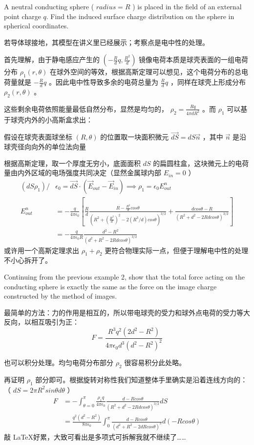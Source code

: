 \begin{solution}
    A neutral conducting sphere ( \(radius = R\) ) is placed in the field of an external point charge \(q\). Find the induced surface charge distribution on the sphere in spherical coordinates.
\tcbrule

    若导体球接地，其模型在讲义里已经展示；考察点是电中性的处理。
    
    首先理解，由于静电感应产生的 \((-\frac{R}{d} q,\frac{R^2}{d})\) 镜像电荷本质是球壳表面的一组电荷分布 \(\rho_1 (r,\theta)\) 在球外空间的等效，根据高斯定理可以想见，这个电荷分布的总电荷量就是 \(-\frac{R}{d} q\) 。因此电中性导致多余的电荷总量为 \(\frac{R}{d} q\) ，同样在球壳上形成分布 \(\rho_2 (r,\theta)\) 。

    这些剩余电荷依照能量最低自然分布，显然是均匀的， \(\rho_2 = \frac{Rq}{4\pi d R^2}\) 。而 \(\rho_1\) 可以基于球壳内外的小高斯盒求出：

    假设在球壳表面球坐标 \((R,\theta)\) 的位置取一块面积微元 \(\vec{dS}=dS \vec{n}\) ，其中 \(\vec{n}\) 是沿球壳径向向外的单位法向量
    
    根据高斯定理，取一个厚度无穷小，底面面积 \(dS\) 的扁圆柱盒，这块微元上的电荷量由内外区域的电场强度共同决定（显然金属球内部 \(E_{in}=0\) ）
    \begin{align}
        (dS \rho_1)/&\epsilon_0 = \vec{dS}\cdot (\vec{E}_{out}-\vec{E}_{in}) \implies \rho_1 = \epsilon_0 E_{out}^n \\
        E_{out}^n&=-\frac{q}{4\pi \epsilon_0}[\frac{R}{d}\frac{R-\frac{R^2}{d} cos\theta}{(R^2+(\frac{R^2}{d})^2-2(R^3/d) cos\theta)^{3/2}}+\frac{d cos\theta - R}{(R^2+d^2-2Rd cos\theta)^{3/2}}]\\
        &=-\frac{q}{4\pi \epsilon_0 R}\frac{d^2-R^2}{(d^2+R^2-2Rdcos\theta)^{3/2}}
    \end{align}
    或许用一个高斯定理求出 \(\rho_1 + \rho_2\) 更符合物理实际一点，但便于理解电中性的处理不小心拆开了。
\end{solution}

\begin{solution}
    Continuing from the previous example 2, show that the total force acting on the conducting sphere is exactly the same as the force on the image charge constructed by the method of images.
\tcbrule

    最简单的方法：力的作用是相互的，所以带电球壳的受力和球外点电荷的受力等大反向，以相互吸引为正：
    \[
        F=\frac{R^3 q^2 (2d^2-R^2)}{4\pi\epsilon_0 d^3 (d^2-R^2)^2}
    \]

    也可以积分处理。均匀电荷分布部分 \(\rho_2\) 很容易积分此处略。
    
    再证明 \(\rho_1\) 部分即可。根据旋转对称性我们知道整体手里确实是沿着连线方向的：（ \(dS=2\pi R^2 sin \theta d\theta\) ）
    \begin{align}
    F&=-\int_{\theta=0}^\pi \frac{\rho_1 q}{4\pi \epsilon_0}\frac{d-R cos \theta}{(R^2+d^2-2Rd cos\theta)^{3/2}}dS\\
    &=\frac{q^2 (d^2-R^2)}{8\pi \epsilon_0}\int_0^\pi \frac{d-Rcos\theta}{(d^2+R^2-2dRcos\theta)^3} d (-Rcos\theta)
    \end{align}
    敲 \LaTeX 好累，大致可看出是多项式可拆解我就不继续了……
\end{solution}

